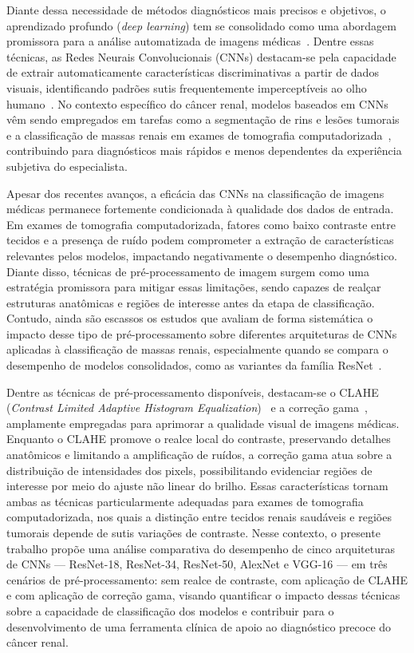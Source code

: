 \documentclass[conference]{IEEEtran}
\begin{document}
Diante dessa necessidade de métodos diagnósticos mais precisos e objetivos,
o aprendizado profundo (\textit{deep learning}) tem se consolidado como uma
abordagem promissora para a análise automatizada de imagens
médicas~\cite{lecun2015}. Dentre essas técnicas, as Redes Neurais
Convolucionais (CNNs) destacam-se pela capacidade de extrair automaticamente
características discriminativas a partir de dados visuais, identificando
padrões sutis frequentemente imperceptíveis ao olho humano~\cite{litjens2017}.
No contexto específico do câncer renal, modelos baseados em CNNs vêm sendo
empregados em tarefas como a segmentação de rins e lesões
tumorais~\cite{heller2021} e a classificação de massas renais em exames de
tomografia computadorizada~\cite{uhm2021,klontzas2024}, contribuindo para
diagnósticos mais rápidos e menos dependentes da experiência subjetiva do
especialista.

Apesar dos recentes avanços, a eficácia das CNNs na classificação de imagens
médicas permanece fortemente condicionada à qualidade dos dados de entrada. Em
exames de tomografia computadorizada, fatores como baixo contraste entre
tecidos e a presença de ruído podem comprometer a extração de características
relevantes pelos modelos, impactando negativamente o desempenho diagnóstico.
Diante disso, técnicas de pré-processamento de imagem surgem como uma
estratégia promissora para mitigar essas limitações, sendo capazes de realçar
estruturas anatômicas e regiões de interesse antes da etapa de classificação.
Contudo, ainda são escassos os estudos que avaliam de forma sistemática o
impacto desse tipo de pré-processamento sobre diferentes arquiteturas de CNNs
aplicadas à classificação de massas renais, especialmente quando se compara o
desempenho de modelos consolidados, como as variantes da família
ResNet~\cite{he2016}.

Dentre as técnicas de pré-processamento disponíveis, destacam-se o CLAHE
(\textit{Contrast Limited Adaptive Histogram Equalization})~\cite{clahe} e a
correção gama~\cite{gonzalez2018}, amplamente empregadas para aprimorar a
qualidade visual de imagens médicas. Enquanto o CLAHE promove o realce local do contraste,
preservando detalhes anatômicos e limitando a amplificação de ruídos, a
correção gama atua sobre a distribuição de intensidades dos pixels,
possibilitando evidenciar regiões de interesse por meio do ajuste não linear
do brilho. Essas características tornam ambas as técnicas particularmente
adequadas para exames de tomografia computadorizada, nos quais a distinção
entre tecidos renais saudáveis e regiões tumorais depende de sutis variações
de contraste. Nesse contexto, o presente trabalho propõe uma análise
comparativa do desempenho de cinco arquiteturas de CNNs --- ResNet-18,
ResNet-34, ResNet-50, AlexNet e VGG-16 --- em três cenários de
pré-processamento: sem realce de contraste, com aplicação de CLAHE e com
aplicação de correção gama, visando quantificar o impacto dessas técnicas
sobre a capacidade de classificação dos modelos e contribuir para o
desenvolvimento de uma ferramenta clínica de apoio ao diagnóstico precoce do
câncer renal.
\end{document}
